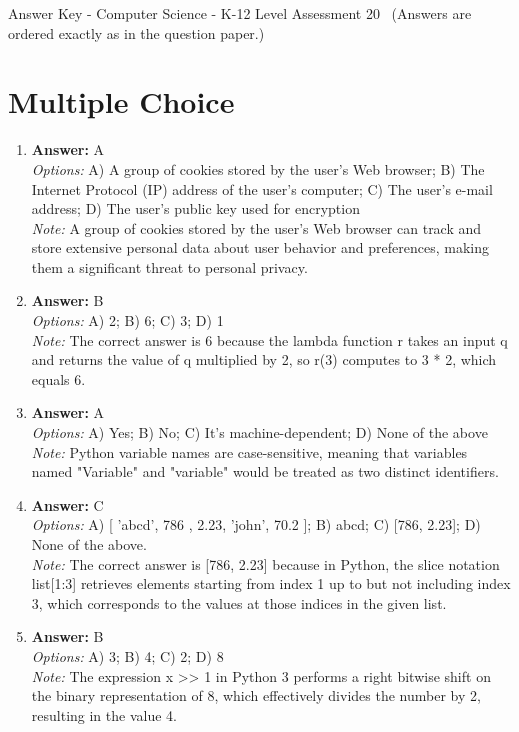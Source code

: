 \documentclass[12pt]{article}
\begin{document}
\begin{center}
Answer Key - Computer Science - K-12 Level Assessment 20 \
\small (Answers are ordered exactly as in the question paper.)
\end{center}

\section*{Multiple Choice}
\begin{enumerate}[label=\arabic*.]
\item \textbf{Answer:} A
\\ \textit{Options:} A) A group of cookies stored by the user's Web browser; B) The Internet Protocol (IP) address of the user's computer; C) The user's e-mail address; D) The user's public key used for encryption
\\ \textit{Note:} A group of cookies stored by the user's Web browser can track and store extensive personal data about user behavior and preferences, making them a significant threat to personal privacy.
\item \textbf{Answer:} B
\\ \textit{Options:} A) 2; B) 6; C) 3; D) 1
\\ \textit{Note:} The correct answer is 6 because the lambda function r takes an input q and returns the value of q multiplied by 2, so r(3) computes to 3 * 2, which equals 6.
\item \textbf{Answer:} A
\\ \textit{Options:} A) Yes; B) No; C) It's machine-dependent; D) None of the above
\\ \textit{Note:} Python variable names are case-sensitive, meaning that variables named "Variable" and "variable" would be treated as two distinct identifiers.
\item \textbf{Answer:} C
\\ \textit{Options:} A) [ 'abcd', 786 , 2.23, 'john', 70.2 ]; B) abcd; C) [786, 2.23]; D) None of the above.
\\ \textit{Note:} The correct answer is [786, 2.23] because in Python, the slice notation list[1:3] retrieves elements starting from index 1 up to but not including index 3, which corresponds to the values at those indices in the given list.
\item \textbf{Answer:} B
\\ \textit{Options:} A) 3; B) 4; C) 2; D) 8
\\ \textit{Note:} The expression x \textgreater{}\textgreater{} 1 in Python 3 performs a right bitwise shift on the binary representation of 8, which effectively divides the number by 2, resulting in the value 4.
\end{enumerate}
\end{document}
